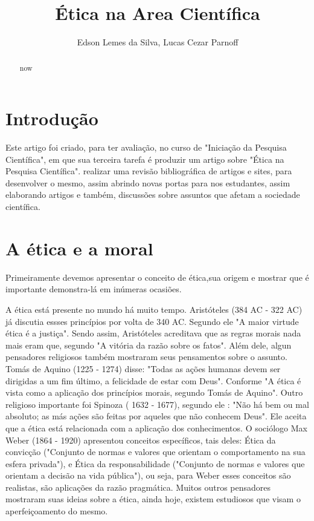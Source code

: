 \documentclass[12pt]{article}
\title{Ética na Area Cientí­fica}
\author{Edson Lemes da Silva\inst{1}, Lucas Cezar Parnoff\inst{1}}
\begin{document}
 

\maketitle

\begin{abstract}
  now
\end{abstract}
     
\begin{resumo} 
  
\end{resumo}


\section{Introdução}\label{sec:introducao}

Este artigo foi criado, para ter avaliação,
no curso de "Iniciação da Pesquisa Científica",
em que sua terceira tarefa é produzir um artigo
sobre "Ética na Pesquisa Científica". 
realizar uma 
revisão bibliográfica de artigos e sites, 
para desenvolver o mesmo, assim abrindo novas portas
para nos estudantes, assim elaborando artigos e
também, discussões sobre assuntos que afetam a 
sociedade científica.  

\section{A ética e a moral}\label{sec:conteudo}


Primeiramente devemos apresentar o conceito de ética,sua origem e mostrar que é importante demonstra-lá em inúmeras ocasiões.

A ética está presente no mundo há muito tempo. Aristóteles  (384 AC - 322 AC) já discutia essses princípios por volta de 340 AC. Segundo ele "A maior virtude ética é a justiça". Sendo assim, Aristóteles acreditava que as regras morais nada mais eram que, segundo \cite{FABIO} "A vitória da razão sobre os fatos". Além dele, algun pensadores religiosos também mostraram seus pensamentos sobre o assunto. Tomás de Aquino (1225 - 1274) disse: "Todas as ações humanas devem ser dirigidas a um fim último, a felicidade de estar com Deus". Conforme \cite{ORLANDO} "A ética é vista como a aplicação dos princípios morais, segundo Tomás de Aquino". Outro religioso importante foi Spinoza ( 1632 - 1677), segundo ele : "Não há bem ou mal absoluto; as más ações são feitas por aqueles que não conhecem Deus". Ele aceita que a ética está relacionada com a aplicação dos conhecimentos. O sociólogo Max Weber (1864 - 1920) apresentou conceitos específicos, tais deles: Ética da convicção ("Conjunto de normas e valores que orientam o comportamento na sua esfera privada"), e Ética da responsabilidade ("Conjunto de normas e valores que orientam a decisão na vida pública"), ou seja, para Weber esses conceitos são realistas, são aplicações da razão pragmática. Muitos outros pensadores mostraram suas ideias sobre a ética, ainda hoje, existem estudiosos que visam o aperfeiçoamento do mesmo.
\end{document}
